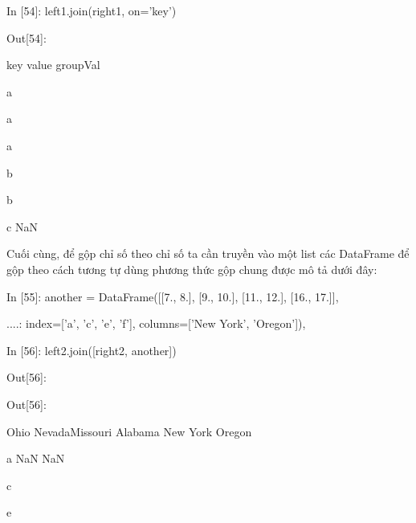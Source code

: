      \quad\textup{In [54]: left1.join(right1, on='key')}\par
     \quad\textup{Out[54]:}\par
     \quad \quad key \quad value \quad  groupVal \par
      \quad a \quad \quad {}  \quad\quad{} \par
      \quad a \quad \quad {} \quad\quad{} \par
      \quad a \quad \quad {}  \quad\quad{} \par
      \quad b \quad \quad {} \quad\quad{} \par
      \quad b \quad \quad {} \quad\quad{} \par
      \quad c \quad \quad {} \quad\quad\quad NaN \\\par
    Cuối cùng, để gộp chỉ số theo chỉ số ta cần truyền vào một list các DataFrame để gộp theo cách tương tự dùng phương thức gộp chung được mô tả dưới đây: \par
    \quad\textup{In [55]: another = DataFrame([[7., 8.], [9., 10.], [11., 12.], [16., 17.]],
}\par
    \quad\textup{\quad\quad....: \quad\quad\quad\quad\quad index=['a', 'c', 'e', 'f'], columns=['New York', 'Oregon']),
}\\\par
    \quad\textup{In [56]: left2.join([right2, another])}\par
    \quad\textup{Out[56]:
}\par
    \quad\textup{Out[56]:}\par
    \quad \quad  Ohio \quad Nevada\quad Missouri \quad Alabama \quad New York \quad Oregon  \par
     \quad a \quad {} \quad\quad {} \quad\quad\quad NaN \quad \quad \quad NaN \quad \quad \quad{} \quad\quad{}  \par
     \quad c \quad {} \quad\quad {} \quad\quad\quad{} \quad \quad \quad {} \quad \quad \quad{} \quad\quad{}  \par
      \quad e \quad {} \quad\quad {} \quad\quad\quad{} \quad \quad {} \quad \quad \quad{} \quad\quad{}  \par

